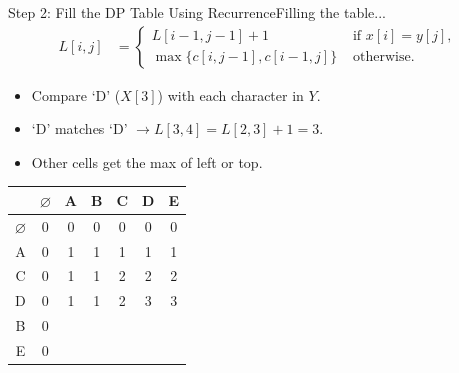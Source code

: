 \documentclass[aspectratio=169]{beamer}
\begin{document}
\begin{frame}{Step 2: Fill the DP Table Using Recurrence}{Filling the table...}
    \vspace{-10mm}
    \scriptsize
    \begin{equation*}
        \begin{align*}
            L[i, j] &=
                        \begin{cases}
                            L[i - 1, j - 1] + 1 & \text{ if } x[i] = y[j] \text{, } \\
                            \max \{ c[i, j - 1], c[i - 1, j] \} & \text{ otherwise.}
                        \end{cases}
        \end{align*}
    \end{equation*}
    \begin{itemize}
        \item Compare `D' ($X[3]$) with each character in $Y$.
        \item `D' matches `D' $\longrightarrow L[3,4] = L[2,3] + 1 = 3$.
        \item Other cells get the max of left or top.
    \end{itemize}
    \vspace{6mm}
    \normalsize
    \centering
    \begin{tabular}{|c|c|c|c|c|c|c|} \hline
                      & $\varnothing$ & A & B & C & D & E \\ \hline
        $\varnothing$ &        0      & 0 & 0 & 0 & 0 & 0 \\ \hline
               A      &        0      & 1 & 1 & 1 & 1 & 1 \\ \hline
               C      &        0      & 1 & 1 & 2 & 2 & 2 \\ \hline
               D      &        0      & 1 & 1 & 2 & 3 & 3 \\ \hline
               B      &        0      &   &   &   &   &   \\ \hline
               E      &        0      &   &   &   &   &   \\ \hline
    \end{tabular}
\end{frame}
\end{document}
